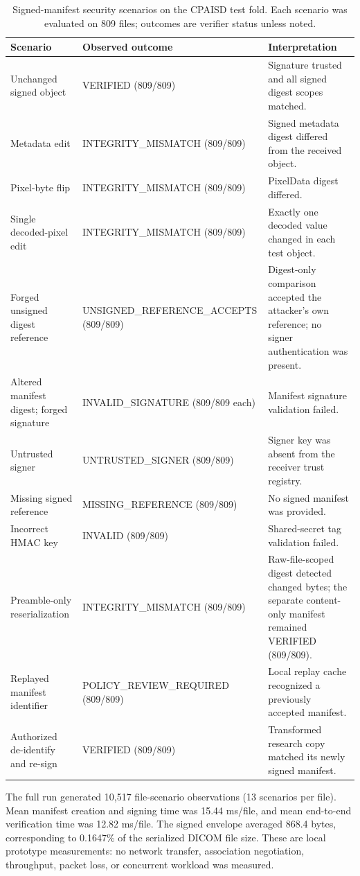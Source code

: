 \documentclass[journal]{IEEEtran}
\begin{document}
  \begin{table}[t]
  \caption{Signed-manifest security scenarios on the CPAISD test fold. Each scenario was evaluated on 809 files; outcomes are verifier status unless noted.}
  \label{tab:signed_manifest_scenarios}
  \centering\scriptsize
  \begin{tabular}{p{5.1cm}p{4.0cm}p{6.2cm}}
  \toprule
  Scenario & Observed outcome & Interpretation \\
  \midrule
  Unchanged signed object & VERIFIED (809/809) & Signature trusted and all signed digest scopes matched. \\
  Metadata edit & INTEGRITY\_MISMATCH (809/809) & Signed metadata digest differed from the received object. \\
  Pixel-byte flip & INTEGRITY\_MISMATCH (809/809) & PixelData digest differed. \\
  Single decoded-pixel edit & INTEGRITY\_MISMATCH (809/809) & Exactly one decoded value changed in each test object. \\
  Forged unsigned digest reference & UNSIGNED\_REFERENCE\_ACCEPTS (809/809) & Digest-only comparison accepted the attacker's own reference; no signer authentication was present. \\
  Altered manifest digest; forged signature & INVALID\_SIGNATURE (809/809 each) & Manifest signature validation failed. \\
  Untrusted signer & UNTRUSTED\_SIGNER (809/809) & Signer key was absent from the receiver trust registry. \\
  Missing signed reference & MISSING\_REFERENCE (809/809) & No signed manifest was provided. \\
  Incorrect HMAC key & INVALID (809/809) & Shared-secret tag validation failed. \\
  Preamble-only reserialization & INTEGRITY\_MISMATCH (809/809) & Raw-file-scoped digest detected changed bytes; the separate content-only manifest remained VERIFIED (809/809). \\
  Replayed manifest identifier & POLICY\_REVIEW\_REQUIRED (809/809) & Local replay cache recognized a previously accepted manifest. \\
  Authorized de-identify and re-sign & VERIFIED (809/809) & Transformed research copy matched its newly signed manifest. \\
  \bottomrule
  \end{tabular}
  \end{table}

  The full run generated 10,517 file-scenario observations (13 scenarios per file). Mean manifest creation and signing time was 15.44 ms/file, and mean end-to-end verification time was 12.82 ms/file. The signed envelope averaged 868.4 bytes, corresponding to 0.1647\% of the serialized DICOM file size. These are local prototype measurements: no network transfer, association negotiation, throughput, packet loss, or concurrent workload was measured.
\end{document}
